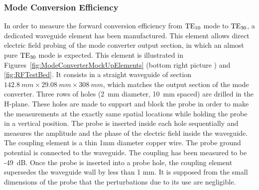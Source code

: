\clearpage
\subsubsection{Mode Conversion Efficiency}
In order to measure the forward conversion efficiency from ${\mathrm{TE}}_{10}$ mode to ${\mathrm{TE}}_{30}$, a dedicated waveguide element has been manufactured. This element allows direct electric field probing of the mode converter output section, in which an almost pure ${\mathrm{TE}}_{30}$ mode is expected. This element is illustrated in Figures~\ref{fig:ModeConverterMockUpElements} (bottom right picture ) and \ref{fig:RFTestBed}. It consists in a straight waveguide of section $142.8~\si{mm}\times29.08~\si{mm}\times308~\si{mm}$, which matches the output section of the mode converter. Three rows of holes (2~mm diameter, 10~mm spaced) are drilled in the H-plane. These holes are made to support and block the probe in order to make the measurements at the exactly same spatial locations while holding the probe in a vertical position. The probe is inserted inside each hole sequentially and measures the amplitude and the phase of the electric field inside the waveguide. The coupling element is a thin 1mm diameter copper wire.  The probe ground potential is connected to the waveguide. The coupling has been measured to be -49~dB. Once the probe is inserted into a probe hole, the coupling element supersedes the waveguide wall by less than 1 mm. It is supposed from the small dimensions of the probe that the perturbations due to its use are negligible.  

